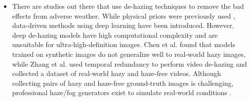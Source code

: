 \documentclass[rnd]{mas_proposal}
\begin{document}
\begin{itemize}

      
      \item There are studies out there that use de-hazing techniques to remove the bad effects from adverse weather. While physical priors were previously used \cite{tan2008visibility, tarel2009fast}, data-driven methods using deep learning have been introduced. However, deep de-hazing models have high computational complexity and are unsuitable for ultra-high-definition images. Chen et al. \cite{chen2021psd} found that models trained on synthetic images do not generalize well to real-world hazy images, while Zhang et al. \cite{zhang2021learning} used temporal redundancy to perform video de-hazing and collected a dataset of real-world hazy and haze-free videos. Although collecting pairs of hazy and haze-free ground-truth images is challenging, professional haze/fog generators exist to simulate real-world conditions \cite{musat2021multi, timofte2018ntire}.


\end{itemize}
\end{document}
